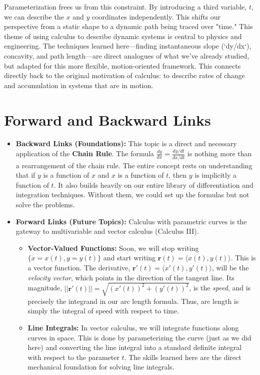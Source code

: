 \documentclass{article}
\begin{document}
Parameterization frees us from this constraint. By introducing a third variable, $t$, we can describe the $x$ and $y$ coordinates independently. This shifts our perspective from a static shape to a dynamic path being traced over "time." This theme of using calculus to describe dynamic systems is central to physics and engineering. The techniques learned here—finding instantaneous slope (`dy/dx`), concavity, and path length—are direct analogues of what we've already studied, but adapted for this more flexible, motion-oriented framework. This connects directly back to the original motivation of calculus: to describe rates of change and accumulation in systems that are in motion.

\section{Forward and Backward Links}
\begin{itemize}
    \item \textbf{Backward Links (Foundations):} This topic is a direct and necessary application of the \textbf{Chain Rule}. The formula $\frac{dy}{dx} = \frac{dy/dt}{dx/dt}$ is nothing more than a rearrangement of the chain rule. The entire concept rests on understanding that if $y$ is a function of $x$ and $x$ is a function of $t$, then $y$ is implicitly a function of $t$. It also builds heavily on our entire library of differentiation and integration techniques. Without them, we could set up the formulas but not solve the problems.
    \item \textbf{Forward Links (Future Topics):} Calculus with parametric curves is the gateway to multivariable and vector calculus (Calculus III).
        \begin{itemize}
            \item \textbf{Vector-Valued Functions:} Soon, we will stop writing $\{x=x(t), y=y(t)\}$ and start writing $\mathbf{r}(t) = \langle x(t), y(t) \rangle$. This is a vector function. The derivative, $\mathbf{r}'(t) = \langle x'(t), y'(t) \rangle$, will be the \textit{velocity vector}, which points in the direction of the tangent line. Its magnitude, $||\mathbf{r}'(t)|| = \sqrt{(x'(t))^2 + (y'(t))^2}$, is the \textit{speed}, and is precisely the integrand in our arc length formula. Thus, arc length is simply the integral of speed with respect to time.
            \item \textbf{Line Integrals:} In vector calculus, we will integrate functions along curves in space. This is done by parameterizing the curve (just as we did here) and converting the line integral into a standard definite integral with respect to the parameter $t$. The skills learned here are the direct mechanical foundation for solving line integrals.
        \end{itemize}
\end{itemize}
\end{document}
